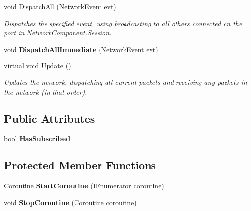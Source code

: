 \begin{DoxyCompactItemize}
void \hyperlink{class_skyrates_1_1_common_1_1_network_1_1_network_common_a5855288bb041d84f998da97347f7b3ee}{Dispatch\-All} (\hyperlink{class_skyrates_1_1_common_1_1_network_1_1_event_1_1_network_event}{Network\-Event} evt)
\begin{DoxyCompactList}\small\item\em Dispatches the specified event, using broadcasting to all others connected on the port in \hyperlink{class_skyrates_1_1_common_1_1_network_1_1_network_component}{Network\-Component}.\hyperlink{class_skyrates_1_1_common_1_1_network_1_1_session}{Session}. \end{DoxyCompactList}\item 
\hypertarget{class_skyrates_1_1_common_1_1_network_1_1_network_common_a3224df115337518157c02a498c4ece8a}{void {\bfseries Dispatch\-All\-Immediate} (\hyperlink{class_skyrates_1_1_common_1_1_network_1_1_event_1_1_network_event}{Network\-Event} evt)}\label{class_skyrates_1_1_common_1_1_network_1_1_network_common_a3224df115337518157c02a498c4ece8a}

\item 
virtual void \hyperlink{class_skyrates_1_1_common_1_1_network_1_1_network_common_aeeaf913a5fe9ee8cb966271ee864bc08}{Update} ()
\begin{DoxyCompactList}\small\item\em Updates the network, dispatching all current packets and receiving any packets in the network (in that order). \end{DoxyCompactList}\end{DoxyCompactItemize}
\subsection*{Public Attributes}
\begin{DoxyCompactItemize}
\item 
\hypertarget{class_skyrates_1_1_common_1_1_network_1_1_network_common_a9f833b15b7d54ca778c662c0223f3ee9}{bool {\bfseries Has\-Subscribed}}\label{class_skyrates_1_1_common_1_1_network_1_1_network_common_a9f833b15b7d54ca778c662c0223f3ee9}

\end{DoxyCompactItemize}
\subsection*{Protected Member Functions}
\begin{DoxyCompactItemize}
\item 
\hypertarget{class_skyrates_1_1_common_1_1_network_1_1_network_common_a2ba453467379317d64434381a3f88790}{Coroutine {\bfseries Start\-Coroutine} (I\-Enumerator coroutine)}\label{class_skyrates_1_1_common_1_1_network_1_1_network_common_a2ba453467379317d64434381a3f88790}

\item 
\hypertarget{class_skyrates_1_1_common_1_1_network_1_1_network_common_a75687f01ff0549a508696e38e55bbb32}{void {\bfseries Stop\-Coroutine} (Coroutine coroutine)}\label{class_skyrates_1_1_common_1_1_network_1_1_network_common_a75687f01ff0549a508696e38e55bbb32}

\end{DoxyCompactItemize}


